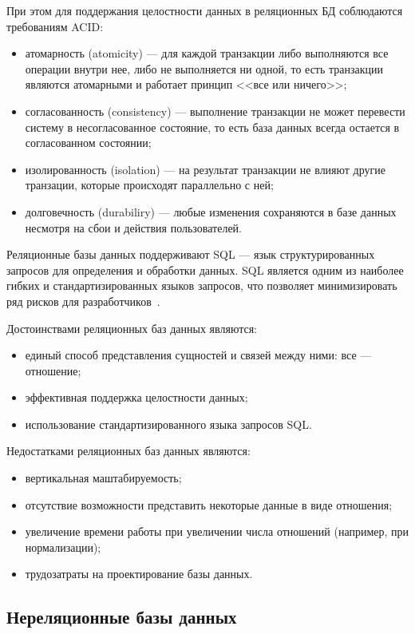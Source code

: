 При этом для поддержания целостности данных в реляционных БД соблюдаются
требованиям ACID:
\begin{itemize}
    \item атомарность (atomicity) --- для каждой транзакции либо выполняются все
        операции внутри нее, либо не выполняется ни одной, то есть
        транзакции являются атомарными и работает принцип <<все или ничего>>;
    \item согласованность (consistency) --- выполнение транзакции не может
        перевести систему в несогласованное состояние, то есть база данных
        всегда остается в согласованном состоянии;
    \item изолированность (isolation) --- на результат транзакции не влияют
        другие транзации, которые происходят параллельно с ней;
    \item долговечность (durabiliry) --- любые изменения сохраняются в базе
        данных несмотря на сбои и действия пользователей.
\end{itemize}

Реляционные базы данных поддерживают SQL --- язык структурированных запросов для
определения и обработки данных. SQL является одним из наиболее гибких и
стандартизированных языков запросов, что позволяет минимизировать ряд рисков
для разработчиков~\cite{art04}.

Достоинствами реляционных баз данных являются:
\begin{itemize}
    \item единый способ представления сущностей и связей между ними:
        все --- отношение;
    \item эффективная поддержка целостности данных;
    \item использование стандартизированного языка запросов SQL.
\end{itemize}

Недостатками реляционных баз данных являются:
\begin{itemize}
    \item вертикальная маштабируемость;
    \item отсутствие возможности представить некоторые данные в виде отношения;
    \item увеличение времени работы при увеличении числа отношений (например,
        при нормализации);
    \item трудозатраты на проектирование базы данных.
\end{itemize}

\subsection{Нереляционные базы данных}


